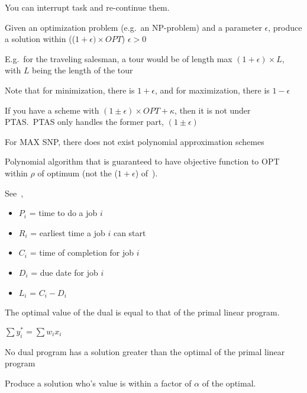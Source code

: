 \begin{definition}\label{pre-emptive}
    You can interrupt task and re-continue them.
\end{definition}


\begin{definition}\label{PTAS}
    Given an optimization problem (e.g.\ an NP-problem) and a parameter 
    $\epsilon$, produce a solution within (($1 + \epsilon) \times OPT$)
    $\epsilon > 0$

    E.g.\ for the traveling salesman, a tour would be of length max 
    $(1 + \epsilon) \times L$, with $L$ being the length of the tour

    Note that for minimization, there is $1 + \epsilon$, and for maximization,
    there is $1 - \epsilon$
    
    If you have a scheme with $(1 \pm \epsilon) \times OPT + \kappa$, then 
    it is not under PTAS.\ PTAS only handles the former part, $(1 \pm \epsilon)$

    For MAX SNP, there does not exist polynomial approximation schemes
\end{definition}

\begin{definition}
    Polynomial algorithm that is guaranteed to have objective function
    to OPT within $\rho$ of
    optimum (not the ($1 + \epsilon$) of~).
\end{definition}

\begin{definition}[Scheduling]
    See~,
    \begin{itemize}
        \item \textbf{$P_{i}$} = time to do a job $i$
        \item \textbf{$R_{i}$} = earliest time a job $i$ can start
        \item \textbf{$C_{i}$} = time of completion for job $i$
        \item \textbf{$D_{i}$} = due date for job $i$
        \item \textbf{$L_{i}$} = $C_{i} - D_{i}$
    \end{itemize}
\end{definition}

\begin{definition}
    The optimal value of the dual is equal to that of the primal linear program.

    $ \sum{y^{*}_{i}} = \sum{w_{i}x_{i}}$
\end{definition}

\begin{definition}
    No dual program has a solution greater than the optimal of the primal
    linear program
\end{definition}

\begin{definition}
    Produce a solution who's value is within a factor of $\alpha$ 
    of the optimal.
\end{definition}
